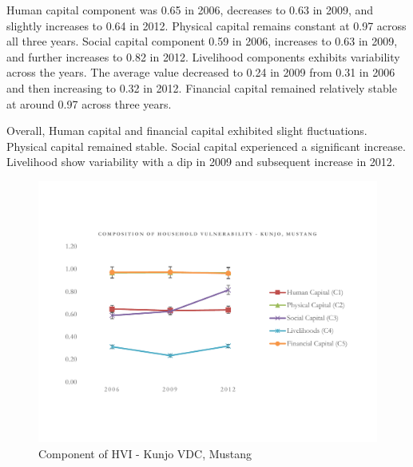 Human capital component was 0.65 in 2006, decreases to 0.63 in 2009, and slightly increases to 0.64 in 2012. Physical capital remains constant at 0.97 across all three years. Social capital component 0.59 in 2006, increases to 0.63 in 2009, and further increases to 0.82 in 2012. Livelihood components exhibits variability across the years. The average value decreased to 0.24 in 2009 from 0.31 in 2006 and then increasing to 0.32 in 2012. Financial capital remained relatively stable at around 0.97 across three years.\par  

Overall, Human capital and financial capital exhibited slight fluctuations. Physical capital remained stable. Social capital experienced a significant increase. Livelihood show variability with a dip in 2009 and subsequent increase in 2012.\par      	
\begin{figure}[htb]
	\vspace{-40pt}
	\includegraphics[scale=0.6]{figure/HVI_Component_Kunjo_line.pdf}
	\vspace{-50pt}
	\caption{ Component of HVI - Kunjo VDC, Mustang}
	\setlength{\abovecaptionskip}{4pt}
	\label{fig:hvikunjocomponents}
\end{figure}

